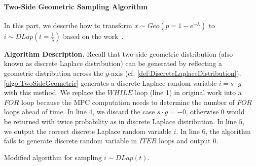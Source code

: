     \paragraph{Two-Side Geometric Sampling Algorithm}
    \label{para:TwoSideGeometricSamplingAlgorithm}
    In this part, we describe how to transform $x \sim Geo\left(p=1-e^{-\lambda}\right) $ to $i\sim DLap\left(t=\frac{1}{\lambda}\right) $ based on the work~\cite{googleDP2019}.

    \textbf{Algorithm Description. }
    Recall that two-side geometric distribution (also known as discrete Laplace distribution) can be generated by reflecting a geometric distribution across the $y$-axis (cf. \autoref{def:DiscreteLaplaceDistribution}).
    \autoref{algo:TwoSideGeometric} generates a discrete Laplace random variable $i=s\cdot g$ with this method. We replace the $WHILE$ loop (line 1) in original work into a $FOR$ loop because the MPC computation needs to determine the number of $FOR$ loops ahead of time.
    In line $4$, we discard the case $s\cdot g =-0$, otherwise $0$ would be returned with twice probability as in discrete Laplace distribution.
    In line $5$, we output the correct discrete Laplace random variable $i$.
    In line $6$, the algorithm fails to generate discrete random variable in $ITER$ loops and output $0$.

    \begin{algorithm}[tbh!]
        \centering
        \caption{Modified algorithm for sampling $i\sim DLap\left(t\right) $.}
        \label{algo:TwoSideGeometric}
    \end{algorithm}
    \FloatBarrier

